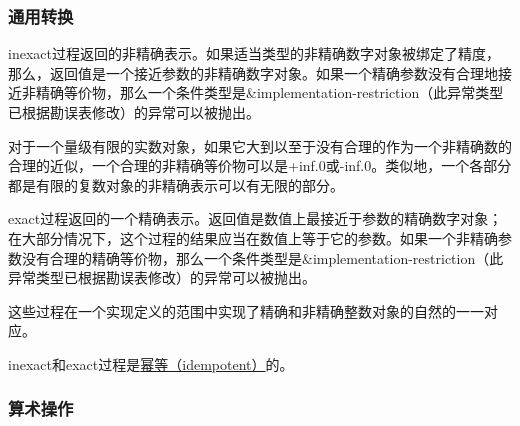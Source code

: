 \subsubsection{通用转换}

\begin{entry}{%
}

{\cf inexact}过程返回的非精确表示。如果适当类型的非精确数字对象被绑定了精度，那么，返回值是一个接近参数的非精确数字对象。如果一个精确参数没有合理地接近非精确等价物，那么一个条件类型是{\cf\&implementation-restriction}（此异常类型已根据勘误表修改）的异常可以被抛出。

\begin{note}
对于一个量级有限的实数对象，如果它大到以至于没有合理的作为一个非精确数的合理的近似，一个合理的非精确等价物可以是{\cf +inf.0}或{\cf -inf.0}。类似地，一个各部分都是有限的复数对象的非精确表示可以有无限的部分。
\end{note}

{\cf exact}过程返回的一个精确表示。返回值是数值上最接近于参数的精确数字对象；在大部分情况下，这个过程的结果应当在数值上等于它的参数。如果一个非精确参数没有合理的精确等价物，那么一个条件类型是{\cf\&implementation-restriction}（此异常类型已根据勘误表修改）的异常可以被抛出。

这些过程在一个实现定义的范围中实现了精确和非精确整数对象的自然的一一对应。

{\cf inexact}和{\cf exact}过程是\href{https://r6rs.mrliu.org/r6rs-translation-experience\#idempotent}{幂等（idempotent）}的。
\end{entry}

\subsubsection{算术操作}

